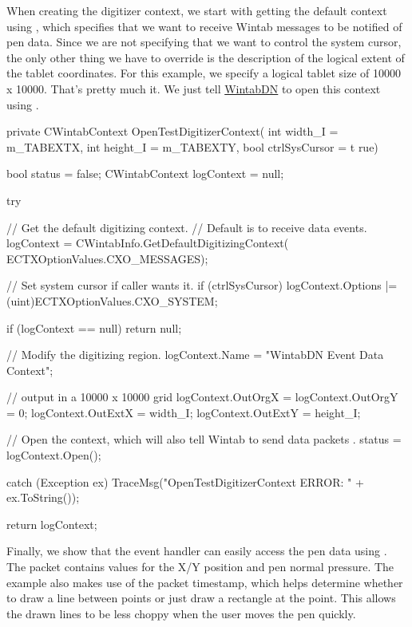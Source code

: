 When creating the digitizer context, we start with getting the default context using {}, which specifies that we want to receive Wintab messages to be notified of pen data. Since we are not specifying that we want to control the system cursor, the only other thing we have to override is the description of the logical extent of the tablet coordinates. For this example, we specify a logical tablet size of 10000 x 10000. That's pretty much it. We just tell \hyperlink{namespace_wintab_d_n}{WintabDN} to open this context using {}.


\begin{DoxyCode}
    private CWintabContext OpenTestDigitizerContext(
        int width_I = m_TABEXTX, int height_I = m_TABEXTY, bool ctrlSysCursor = t
      rue)
    {
        bool status = false;
        CWintabContext logContext = null;

        try
        {
            // Get the default digitizing context.
            // Default is to receive data events.
            logContext = CWintabInfo.GetDefaultDigitizingContext(
      ECTXOptionValues.CXO_MESSAGES);

            // Set system cursor if caller wants it.
            if (ctrlSysCursor)
            {
                logContext.Options |= (uint)ECTXOptionValues.CXO_SYSTEM;
            }

            if (logContext == null)
            {
                return null;
            }

            // Modify the digitizing region.
            logContext.Name = "WintabDN Event Data Context";

            // output in a 10000 x 10000 grid
            logContext.OutOrgX = logContext.OutOrgY = 0;
            logContext.OutExtX = width_I;
            logContext.OutExtY = height_I;


            // Open the context, which will also tell Wintab to send data packets
      .
            status = logContext.Open();
        }
        catch (Exception ex)
        {
            TraceMsg("OpenTestDigitizerContext ERROR: " + ex.ToString());
        }

        return logContext;
    }
\end{DoxyCode}


Finally, we show that the event handler can easily access the pen data using {}. The packet contains values for the X/Y position and pen normal pressure. The example also makes use of the packet timestamp, which helps determine whether to draw a line between points or just draw a rectangle at the point. This allows the drawn lines to be less choppy when the user moves the pen quickly.


